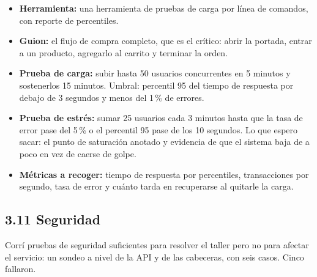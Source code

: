 \documentclass[11pt,a4paper]{article}
\begin{document}
\begin{itemize}
  \item \textbf{Herramienta:} una herramienta de pruebas de carga por línea de comandos, con
        reporte de percentiles.
  \item \textbf{Guion:} el flujo de compra completo, que es el crítico: abrir la
        portada, entrar a un producto, agregarlo al carrito y terminar la orden.
  \item \textbf{Prueba de carga:} subir hasta 50 usuarios concurrentes en
        5 minutos y sostenerlos 15 minutos. Umbral: percentil 95 del tiempo de
        respuesta por debajo de 3 segundos y menos del 1\,\% de errores.
  \item \textbf{Prueba de estrés:} sumar 25 usuarios cada 3 minutos hasta
        que la tasa de error pase del 5\,\% o el percentil 95 pase de los
        10 segundos. Lo que espero sacar: el punto de saturación anotado y
        evidencia de que el sistema baja de a poco en vez de caerse de golpe.
  \item \textbf{Métricas a recoger:} tiempo de respuesta por percentiles,
        transacciones por segundo, tasa de error y cuánto tarda en recuperarse al
        quitarle la carga.
\end{itemize}

\subsection*{3.11 Seguridad}

Corrí pruebas de seguridad suficientes para resolver el taller pero no para afectar
el servicio: un sondeo a nivel de la API y de las cabeceras, con seis casos. Cinco
fallaron.
\end{document}
